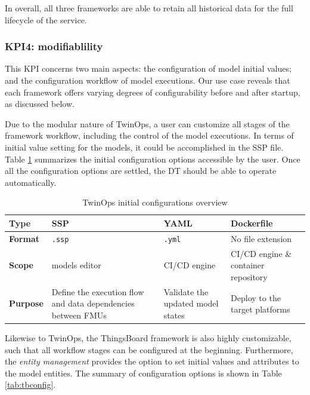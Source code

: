 In overall, all three frameworks are able to retain all historical data for the full lifecycle of the service.

\subsubsection{KPI4: modifiablility}
This KPI concerns two main aspects: the configuration of model initial values; and the configuration workflow of model executions. Our use case reveals that each framework offers varying degrees of configurability before and after startup, as discussed below.

Due to the modular nature of TwinOps, a user can customize all stages of the framework workflow, including the control of the model executions. In terms of initial value setting for the models, it could be accomplished in the SSP file. Table \ref{tab:twopconfig} summarizes the initial configuration options accessible by the user. Once all the configuration options are settled, the DT should be able to operate automatically.

\begin{table}[hbt!]
\centering
\begin{tabularx}{\textwidth}{|p{1.5cm}|p{3.5cm}|p{3.5cm}|X|}
\hline
\textbf{Type} & {SSP} & {YAML} & {Dockerfile} \\ \hline           
\textbf{Format} & \texttt{.ssp} & \texttt{.yml} & No file extension  \\ \hline
\textbf{Scope} & models editor & CI/CD engine & CI/CD engine \& container repository \\ \hline
\textbf{Purpose} & Define the execution flow and data dependencies between FMUs & Validate the updated model states & Deploy to the target platforms \\ \hline    
\end{tabularx}
\caption{TwinOps initial configurations overview}
\label{tab:twopconfig}
\end{table}

Likewise to TwinOps, the ThingsBoard framework is also highly customizable, such that all workflow stages can be configured at the beginning. Furthermore, the \textit{entity management} provides the option to set initial values and attributes to the model entities. The summary of configuration options is shown in Table \ref{tab:tbconfig}.

